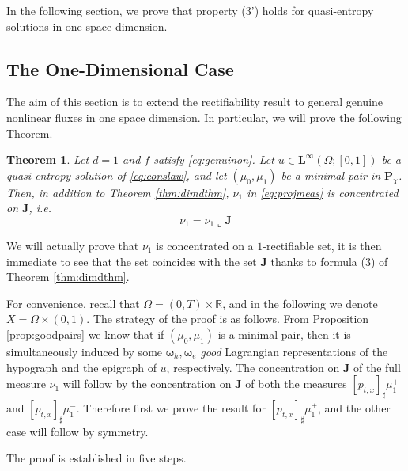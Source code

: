\documentclass[11pt, twoside, reqno]{amsart}
\newtheorem{thm}{Theorem}[section]
\theoremstyle{definition}
\theoremstyle{remark}
\numberwithin{equation}{section}
\newcommand{\bs}[1]{\boldsymbol{#1}}
\begin{document}
In the following section, we prove that property (3') holds for quasi-entropy solutions in one space dimension.
 

\subsection{The One-Dimensional Case}
The aim of this section is to extend the rectifiability result \cite{marconi_burgers} to general genuine nonlinear fluxes in one space dimension. In particular, we will prove the following Theorem.

\begin{thm}\label{thm:1drect}
  Let $d = 1$ and $f$ satisfy \eqref{eq:genuinon}. Let  $u \in \mathbf L^\infty(\Omega; [0,1])$ be a quasi-entropy solution of \eqref{eq:conslaw}, and let $(\mu_0, \mu_1)$ be a minimal pair in $\mathbf P_{\chi}$. Then, in addition to Theorem \ref{thm:dimdthm}, $\nu_1$ in \eqref{eq:projmeas} is concentrated on $\mathbf J$, i.e.
  \begin{equation}\label{eq:concentration}
      \nu_1 = \nu_1 \llcorner \mathbf J
  \end{equation}
\end{thm}

We will actually prove that $\nu_1$ is concentrated on a $1$-rectifiable set, it is then immediate to see that the set coincides with the set $\mathbf J$ thanks to formula (3) of Theorem \ref{thm:dimdthm}.



For convenience, recall that $\Omega = (0,T) \times \mathbb R$, and in the following we denote
$
 X = \Omega \times (0, 1).
$
The strategy of the proof is as follows. From Proposition \ref{prop:goodpairs} we know that if $(\mu_0, \mu_1)$ is a minimal pair, then it is simultaneously induced by some $\bs \omega_h, \bs \omega_e$ \emph{good} Lagrangian representations of  the hypograph and the epigraph of $u$, respectively.
The concentration on $\mathbf J$ of the full measure $\nu_1$ will follow by the concentration on $\mathbf J$ of both the measures $[p_{t, x}]_{\sharp} \mu_1^+$ and $[p_{t, x}]_{\sharp} \mu_1^-$. Therefore first we prove the result for $[p_{t, x}]_{\sharp} \mu_1^+$, and the other case will follow by symmetry.  

The proof is established in five steps.

\vspace{0.5cm}
\end{document}
